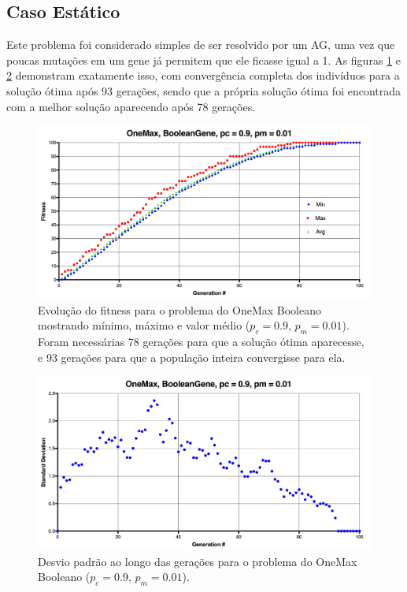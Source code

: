\subsection{Caso Estático}

Este problema foi considerado simples de ser resolvido por um AG, uma vez que poucas mutações em um gene já permitem que ele ficasse igual a 1. As figuras \ref{fig:onemax_boolean} e \ref{fig:onemax_boolean_std} demonstram exatamente isso, com convergência completa dos indivíduos para a solução ótima após 93 gerações, sendo que a própria solução ótima foi encontrada com a melhor solução aparecendo após 78 gerações.

\begin{figure}[ht!]
    \centering \includegraphics[width=1.0\textwidth]{onemax_boolean.jpg}
    \caption{Evolução do fitness para o problema do OneMax Booleano mostrando mínimo, máximo e valor médio ($p_c=0.9$, $p_m=0.01$). Foram necessárias 78 gerações para que a solução ótima aparecesse, e 93 gerações para que a população inteira convergisse para ela.}
    \label{fig:onemax_boolean}
\end{figure}

\begin{figure}[ht!]
    \centering \includegraphics[width=1.0\textwidth]{onemax_boolean_std.jpg}
    \caption{Desvio padrão ao longo das gerações para o problema do OneMax Booleano ($p_c=0.9$, $p_m=0.01$).}
    \label{fig:onemax_boolean_std}
\end{figure}

